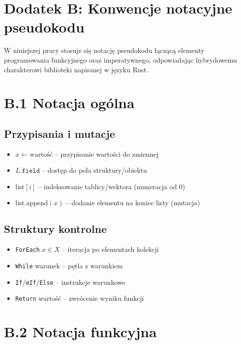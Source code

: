 \newpage
\section*{Dodatek B: Konwencje notacyjne pseudokodu}

W niniejszej pracy stosuje się notację pseudokodu łączącą elementy programowania funkcyjnego oraz imperatywnego, odpowiadając hybrydowemu charakterowi biblioteki napisanej w języku Rust.

\section*{B.1 Notacja ogólna}

\subsection*{Przypisania i mutacje}
\begin{itemize}
	\item $x \leftarrow \text{wartość}$ -- przypisanie wartości do zmiennej
	\item $L.\texttt{field}$ -- dostęp do pola struktury/obiektu
	\item $\text{list}[i]$ -- indeksowanie tablicy/wektora (numeracja od 0)
	\item $\text{list}.\text{append}(x)$ -- dodanie elementu na koniec listy (mutacja)
\end{itemize}

\subsection*{Struktury kontrolne}
\begin{itemize}
	\item \texttt{ForEach} $x \in X$ -- iteracja po elementach kolekcji
	\item \texttt{While} warunek -- pętla z warunkiem
	\item \texttt{If}/\texttt{eIf}/\texttt{Else} -- instrukcje warunkowe
	\item \texttt{Return} wartość -- zwrócenie wyniku funkcji
\end{itemize}

\section*{B.2 Notacja funkcyjna}

